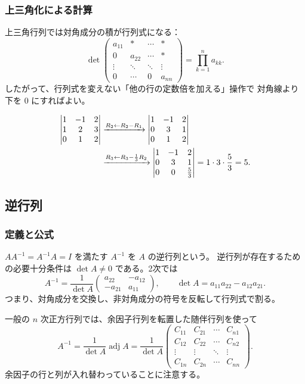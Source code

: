 \subsubsection{上三角化による計算}

上三角行列では対角成分の積が行列式になる：
\[
\det\begin{pmatrix}
a_{11}&*&\cdots&*\\0&a_{22}&\cdots&*\\
\vdots&\ddots&\ddots&\vdots\\0&\cdots&0&a_{nn}
\end{pmatrix}
=\prod_{k=1}^{n}a_{kk}.
\]
したがって、行列式を変えない「他の行の定数倍を加える」操作で
対角線より下を $0$ にすればよい。

\begin{example}
\begin{align}
\begin{vmatrix}1&-1&2\\1&2&3\\0&1&2\end{vmatrix}
&\xrightarrow{R_2\leftarrow R_2-R_1}
\begin{vmatrix}1&-1&2\\0&3&1\\0&1&2\end{vmatrix}\notag\\
&\xrightarrow{R_3\leftarrow R_3-\frac13R_2}
\begin{vmatrix}1&-1&2\\0&3&1\\0&0&\frac53\end{vmatrix}
=1\cdot3\cdot\frac53=5.
\end{align}
\end{example}

\subsection{逆行列}

\subsubsection{定義と公式}

$AA^{-1}=A^{-1}A=I$ を満たす $A^{-1}$ を $A$ の逆行列という。
逆行列が存在するための必要十分条件は $\det A\ne0$ である。2次では
\begin{equation}
A^{-1}=\frac1{\det A}
\begin{pmatrix}a_{22}&-a_{12}\\-a_{21}&a_{11}\end{pmatrix},
\qquad
\det A=a_{11}a_{22}-a_{12}a_{21}.
\end{equation}
つまり、対角成分を交換し、非対角成分の符号を反転して行列式で割る。

一般の $n$ 次正方行列では、余因子行列を転置した随伴行列を使って
\begin{equation}
A^{-1}=\frac1{\det A}\operatorname{adj}A
=\frac1{\det A}
\begin{pmatrix}
C_{11}&C_{21}&\cdots&C_{n1}\\
C_{12}&C_{22}&\cdots&C_{n2}\\
\vdots&\vdots&\ddots&\vdots\\
C_{1n}&C_{2n}&\cdots&C_{nn}
\end{pmatrix}.
\end{equation}
余因子の行と列が入れ替わっていることに注意する。
